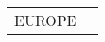 \documentclass[journal abbreviation, manuscript]{copernicus}
\begin{document}
\begin{table}
\begin{tabularx}{\textwidth}{lX}
\middlehline
   EUROPE &                                                                                                                                                                                                                                                                                                                                                                                                                                                                                                                                                                                                                                                                                                                                                                                                                                                                                                                                                                                                                                                                                                                                                                                                                                                                                                                                                                                                                                                                                                                                                                                                                                                                                                                                                                                                                                                                                                                                                                                                                                                                                                                                                                                                                                                                                                                                                                                                                                                                                                                                                                                                                                                                                                                                                                                                                                                                                                                                                                                                                                                                                                                                                                                                                                                                                                                                                                                                 
\end{tabularx}
\end{table}
\end{document}
